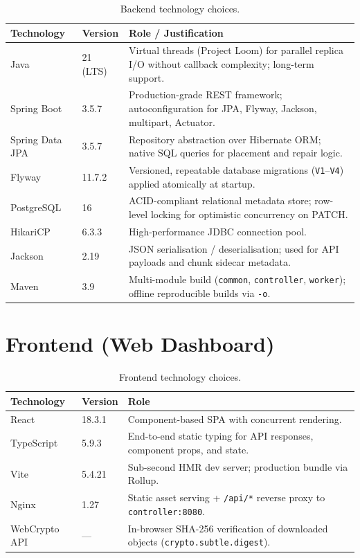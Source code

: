 \documentclass[12pt,a4paper]{report}
\begin{document}
\begin{table}[H]
  \centering
  \caption{Backend technology choices.}
  \label{tab:backend-stack}
  \begin{tabularx}{\textwidth}{llX}
    \toprule
    \textbf{Technology} & \textbf{Version} & \textbf{Role / Justification} \\
    \midrule
    Java          & 21 (LTS)   & Virtual threads (Project Loom) for parallel replica I/O without callback complexity; long-term support. \\
    Spring Boot   & 3.5.7      & Production-grade REST framework; autoconfiguration for JPA, Flyway, Jackson, multipart, Actuator. \\
    Spring Data JPA & 3.5.7   & Repository abstraction over Hibernate ORM; native SQL queries for placement and repair logic. \\
    Flyway        & 11.7.2     & Versioned, repeatable database migrations (\texttt{V1}--\texttt{V4}) applied atomically at startup. \\
    PostgreSQL    & 16         & ACID-compliant relational metadata store; row-level locking for optimistic concurrency on PATCH. \\
    HikariCP      & 6.3.3      & High-performance JDBC connection pool. \\
    Jackson       & 2.19       & JSON serialisation / deserialisation; used for API payloads and chunk sidecar metadata. \\
    Maven         & 3.9        & Multi-module build (\texttt{common}, \texttt{controller}, \texttt{worker}); offline reproducible builds via \texttt{-o}. \\
    \bottomrule
  \end{tabularx}
\end{table}

\section{Frontend (Web Dashboard)}

\begin{table}[H]
  \centering
  \caption{Frontend technology choices.}
  \label{tab:frontend-stack}
  \begin{tabularx}{\textwidth}{llX}
    \toprule
    \textbf{Technology} & \textbf{Version} & \textbf{Role} \\
    \midrule
    React         & 18.3.1  & Component-based SPA with concurrent rendering. \\
    TypeScript    & 5.9.3   & End-to-end static typing for API responses, component props, and state. \\
    Vite          & 5.4.21  & Sub-second HMR dev server; production bundle via Rollup. \\
    Nginx         & 1.27    & Static asset serving + \texttt{/api/*} reverse proxy to \texttt{controller:8080}. \\
    WebCrypto API & ---       & In-browser SHA-256 verification of downloaded objects (\texttt{crypto.subtle.digest}). \\
    \bottomrule
  \end{tabularx}
\end{table}
\end{document}
